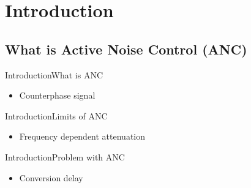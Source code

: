 \section{Introduction}
\subsection{What is Active Noise Control (ANC)}
\begin{frame}{Introduction}{What is ANC}		
	\begin{itemize}
		\item Counterphase signal
	\end{itemize}
\end{frame}
\begin{frame}{Introduction}{Limits of ANC}		
	\begin{itemize}
		\item Frequency dependent attenuation
	\end{itemize}
\end{frame}
\begin{frame}{Introduction}{Problem with ANC}		
	\begin{itemize}
		\item Conversion delay
	\end{itemize}
\end{frame}

